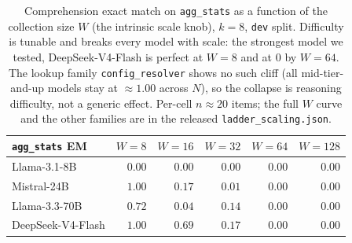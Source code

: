 \begin{table}[t]
\centering
\caption{Comprehension exact match on \texttt{agg\_stats} as a function of the collection
size $W$ (the intrinsic scale knob), $k{=}8$, \texttt{dev} split. Difficulty is tunable and
breaks every model with scale: the strongest model we tested, DeepSeek-V4-Flash is perfect at $W{=}8$ and at $0$
by $W{=}64$. The lookup family \texttt{config\_resolver} shows no such cliff (all
mid-tier-and-up models stay at $\approx 1.00$ across $N$), so the collapse is reasoning
difficulty, not a generic effect. Per-cell $n\approx20$ items; the full $W$ curve and the
other families are in the released \texttt{ladder\_scaling.json}.}
\label{tab:scaling}
\begin{tabular}{@{}lrrrrr@{}}
\toprule
\texttt{agg\_stats} EM & $W{=}8$ & $W{=}16$ & $W{=}32$ & $W{=}64$ & $W{=}128$ \\
\midrule
Llama-3.1-8B      & $0.00$ & $0.00$ & $0.00$ & $0.00$ & $0.00$ \\
Mistral-24B       & $1.00$ & $0.17$ & $0.01$ & $0.00$ & $0.00$ \\
Llama-3.3-70B     & $0.72$ & $0.04$ & $0.14$ & $0.00$ & $0.00$ \\
DeepSeek-V4-Flash & $1.00$ & $0.69$ & $0.17$ & $0.00$ & $0.00$ \\
\bottomrule
\end{tabular}
\end{table}

